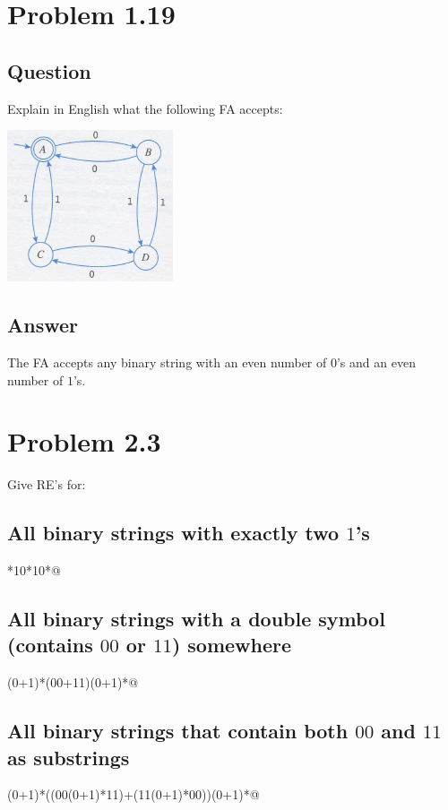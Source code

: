 \documentclass[12pt, a4paper]{article}
\begin{document}
\section{Problem 1.19}
\subsection{Question}
Explain in English what the following FA accepts:
\begin{center}
\includegraphics[scale=1]{1.19-problem}
\end{center}
\subsection{Answer}
The FA accepts any binary string with an even number of $0$'s and an even number of $1$'s.

\section{Problem 2.3}
Give RE's for:
\subsection{All binary strings with exactly two $1$'s}
\begin{center}
*10*10*@
\end{center}
\subsection{All binary strings with a double symbol (contains $00$ or $11$) somewhere}
\begin{center}
\verb@(0+1)*(00+11)(0+1)*@
\end{center}
\subsection{All binary strings that contain both $00$ and $11$ as substrings}
\begin{center}
\verb@(0+1)*((00(0+1)*11)+(11(0+1)*00))(0+1)*@
\end{center}
\end{document}
